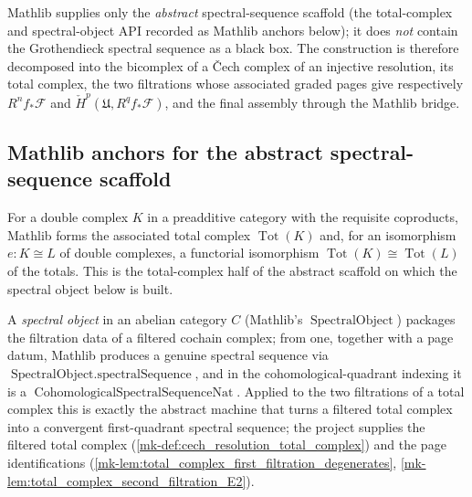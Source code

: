 Mathlib supplies only the \emph{abstract} spectral-sequence scaffold (the
total-complex and spectral-object API recorded as Mathlib anchors below); it does
\emph{not} contain the Grothendieck spectral sequence as a black box. The
construction is therefore decomposed into the bicomplex of a {\v C}ech complex of an
injective resolution, its total complex, the two filtrations whose associated graded
pages give respectively \(R^n f_*\mathcal{F}\) and
\(\check{H}^p(\mathfrak{U}, R^q f_*\mathcal{F})\), and the final assembly through the
Mathlib bridge.

\subsection{Mathlib anchors for the abstract spectral-sequence scaffold}

\begin{lemma}
  \label{mk-lem:total_complex_mathlib}
  \mathlibok

  For a double complex \(K\) in a preadditive category with the requisite coproducts,
  Mathlib forms the associated total complex \(\operatorname{Tot}(K)\) and, for an
  isomorphism \(e : K \cong L\) of double complexes, a functorial isomorphism
  \(\operatorname{Tot}(K) \cong \operatorname{Tot}(L)\) of the totals. This is the
  total-complex half of the abstract scaffold on which the spectral object below is
  built.
\end{lemma}

\begin{lemma}
  \label{mk-lem:spectralObject_spectralSequence_mathlib}
  \mathlibok

  A \emph{spectral object} in an abelian category \(C\) (Mathlib's
  \(\operatorname{SpectralObject}\)) packages the filtration data of a filtered
  cochain complex; from one, together with a page datum, Mathlib produces a genuine
  spectral sequence via \(\operatorname{SpectralObject.spectralSequence}\), and in the
  cohomological-quadrant indexing it is a
  \(\operatorname{CohomologicalSpectralSequenceNat}\). Applied to the two filtrations
  of a total complex this is exactly the abstract machine that turns a filtered total
  complex into a convergent first-quadrant spectral sequence; the project supplies the
  filtered total complex (\ref{mk-def:cech_resolution_total_complex}) and the page
  identifications (\ref{mk-lem:total_complex_first_filtration_degenerates},
  \ref{mk-lem:total_complex_second_filtration_E2}).
\end{lemma}

